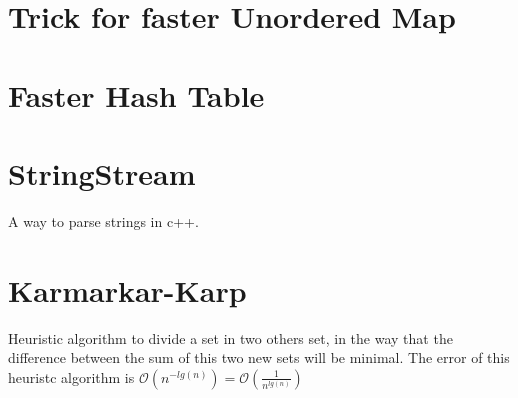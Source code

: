 \section{Trick for faster Unordered Map}
        
\section{Faster Hash Table}
    
\section{StringStream}
    A way to parse strings in c++.
    
\section{Karmarkar-Karp}
    Heuristic algorithm to divide a set in two others set, in the way that the difference between the sum of this two new sets will be minimal.
    The error of this heuristc algorithm is $\mathcal{O}(n^{-lg(n)})=\mathcal{O}(\frac{1}{n^{lg(n)}})$
    